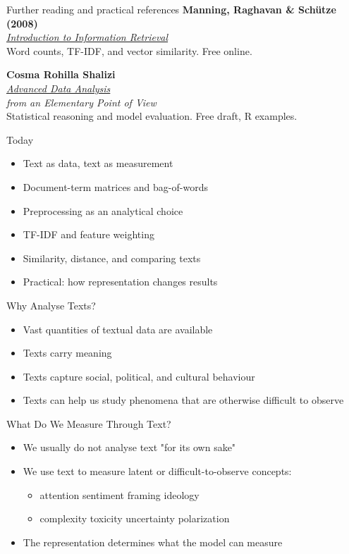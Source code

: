 \documentclass[11pt,aspectratio=43]{beamer}
\begin{document}
\begin{frame}{Further reading and practical references}
\textbf{Manning, Raghavan \& Sch\"utze (2008)}\\
\href{https://nlp.stanford.edu/IR-book/}{\textcolor{blue!50!black}{\textit{Introduction to Information Retrieval}}}\\
Word counts, TF-IDF, and vector similarity. Free online.
\vspace{5mm}

\textbf{Cosma Rohilla Shalizi}\\
\href{https://www.stat.cmu.edu/~cshalizi/ADAfaEPoV/}{\textcolor{blue!50!black}{\textit{Advanced Data Analysis}}}\\
\textit{from an Elementary Point of View}\\
Statistical reasoning and model evaluation. Free draft, R examples.

\end{frame}

\begin{frame}{Today}
\begin{itemize}
\item Text as data, text as measurement
\item Document-term matrices and bag-of-words
\item Preprocessing as an analytical choice
\item TF-IDF and feature weighting
\item Similarity, distance, and comparing texts
\item Practical: how representation changes results
\end{itemize}
\end{frame}


\begin{frame}{Why Analyse Texts?}
\begin{itemize}
\item Vast quantities of textual data are available
\item Texts carry meaning
\item Texts capture social, political, and cultural behaviour
\item Texts can help us study phenomena that are otherwise difficult to observe
\end{itemize}
\end{frame}

\begin{frame}{What Do We Measure Through Text?}
\begin{itemize}
\item We usually do not analyse text "for its own sake"
\item We use text to measure latent or difficult-to-observe concepts:
  \begin{itemize}
  \item attention \quad sentiment \quad framing \quad ideology
  \item complexity \quad toxicity \quad uncertainty \quad polarization
  \end{itemize}
\item The representation determines what the model can measure
\end{itemize}
\end{frame}
\end{document}
